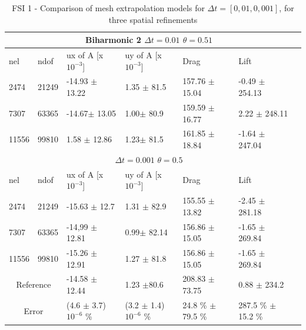 \begin{table}[h!]
\centering
\label{my-label}
\begin{tabular}{ |p{1cm}||p{1cm}|p{3.2cm}|p{3.2cm}|p{2.9cm}|p{3.1cm}|p{1.2cm}|}
 \hline
  \multicolumn{6}{|c|}{Biharmonic 2 \hspace{2mm}  $\Delta t = 0.01$  \hspace{2mm}  $\theta = 0.51$} \\
   \hline
nel & ndof & ux of A [x $10^{-3}$]  &uy of A [x $10^{-3}$]& Drag  & Lift \\
 \hline
 2474    & 21249  & -14.93 $\pm$ 13.22 & 1.35 $\pm$ 81.5 & 157.76  $\pm$ 15.04 & -0.49  $\pm$  254.13 \\
 7307    & 63365  & -14.67$\pm$ 13.05 & 1.00$\pm$ 80.9& 159.59 $\pm$  16.77 & 2.22 $\pm$  248.11  \\
 11556   & 99810  & 1.58 $\pm$ 12.86 & 1.23$\pm$ 81.5& 161.85   $\pm$18.84 & -1.64  $\pm$  247.04 \\
 \hline
  \multicolumn{6}{|c|}{$\Delta t = 0.001$  \hspace{2mm}  $\theta = 0.5$} \\
   \hline
 nel & ndof & ux of A [x $10^{-3}$]  &uy of A [x $10^{-3}$]& Drag  & Lift \\
\hline
 2474    & 21249  & -15.63  $\pm$ 12.7 & 1.31 $\pm$ 82.9 & 155.55      $\pm$ 13.82 & -2.45   $\pm$ 281.18 \\
 7307    & 63365  &  -14,99 $\pm$ 12.81& 0.99$\pm$ 82.14& 156.86    $\pm$  15.05 & -1.65   $\pm$ 269.84 \\
 11556   & 99810  &  -15.26 $\pm$ 12.91 & 1.27  $\pm$ 81.8 & 156.86   $\pm$ 15.05 & -1.65 $\pm$ 269.84 \\
 \hline
\multicolumn{2}{|c|}{Reference} & -14.58 $\pm$ 12.44   & 1.23 $\pm$80.6    & 208.83 $\pm$ 73.75 & 0.88 $\pm$ 234.2 \\
 \hline
\multicolumn{2}{|c|}{Error}  & (4.6 $\pm$ 3.7)$10^{-6}$ \% & (3.2 $\pm$ 1.4)$10^{-6}$ \%& 24.8 \% $\pm$ 79.5 \% & 287.5 \% $\pm$ 15.2 \% \\
 \hline
\end{tabular}
\caption{FSI 1 - Comparison of mesh extrapolation models for $\Delta t = [0,01, 0,001]$, for three spatial refinements}
\end{table}

\newpage

